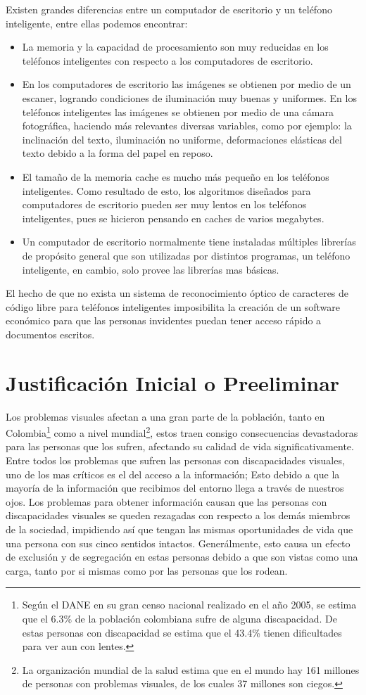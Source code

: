 \documentclass[a4paper, 11pt, oneside]{article}
\begin{document}
	Existen grandes diferencias entre un computador de escritorio y un teléfono inteligente, entre ellas podemos encontrar:
	\begin{itemize}
   \item La memoria y la capacidad de procesamiento son muy reducidas en los teléfonos inteligentes con respecto a los computadores de escritorio.
   \item En los computadores de escritorio las imágenes se obtienen por medio de un escaner, logrando condiciones de iluminación muy buenas y uniformes. En los teléfonos inteligentes las imágenes se obtienen por medio de una cámara fotográfica, haciendo más relevantes diversas variables, como por ejemplo: la inclinación del texto, iluminación no uniforme, deformaciones elásticas del texto debido a la forma del papel en reposo.
   \item El tamaño de la memoria cache es mucho más pequeño en los teléfonos inteligentes. Como resultado de esto, los algoritmos diseñados para computadores de escritorio pueden ser muy lentos en los teléfonos inteligentes, pues se hicieron pensando en caches de varios megabytes.
	\item Un computador de escritorio normalmente tiene instaladas múltiples librerías de propósito general que son utilizadas por distintos programas, un teléfono inteligente, en cambio, solo provee las librerías mas básicas.
	\end{itemize}

	El hecho de que no exista un sistema de reconocimiento óptico de caracteres de código libre para teléfonos inteligentes imposibilita la creación de un software económico para que las personas invidentes puedan tener acceso rápido a documentos escritos.
	\clearpage
	\section{Justificación Inicial o Preeliminar}
	Los problemas visuales afectan a una gran parte de la población, tanto en Colombia\footnote{Según el DANE en su gran censo nacional realizado en el año 2005, se estima que el 6.3\% de la población colombiana sufre de alguna discapacidad. De estas personas con discapacidad se estima que el 43.4\% tienen dificultades para ver aun con lentes.} como a nivel mundial\footnote{La organización mundial de la salud estima que en el mundo hay 161 millones de personas con problemas visuales, de los cuales 37 millones son ciegos.}, estos traen consigo consecuencias devastadoras para las personas que los sufren, afectando su calidad de vida significativamente. Entre todos los problemas que sufren las personas con discapacidades visuales, uno de los mas críticos es el del acceso a la información; Esto debido a que la mayoría de la información que recibimos del entorno llega a través de nuestros ojos. Los problemas para obtener información causan que las personas con discapacidades visuales se queden rezagadas con respecto a los demás miembros de la sociedad, impidiendo así que tengan las mismas oportunidades de vida que una persona con sus cinco sentidos intactos. Generálmente, esto causa un efecto de exclusión y de segregación en estas personas debido a que son vistas como una carga, tanto por si mismas como por las personas que los rodean. 
\end{document}
